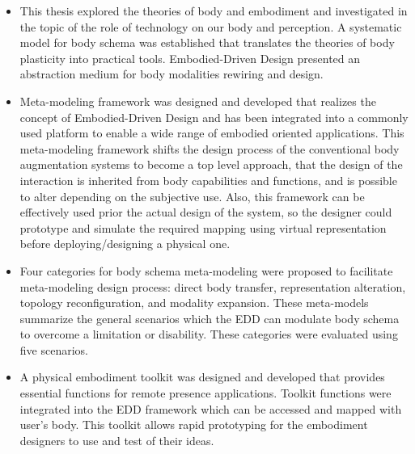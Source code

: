 \begin{itemize}
\item This thesis explored the theories of body and embodiment and investigated in the topic of the role of technology on our body and perception. A systematic model for body schema was established that translates the theories of body plasticity into practical tools. Embodied-Driven Design presented an abstraction medium for body modalities rewiring and design.

\item Meta-modeling framework was designed and developed that realizes the concept of Embodied-Driven Design and has been integrated into a commonly used platform to enable a wide range of embodied oriented applications. This meta-modeling framework shifts the design process of the conventional body augmentation systems to become a top level approach, that the design of the interaction is inherited from body capabilities and functions, and is possible to alter depending on the subjective use. Also, this framework can be effectively used prior the actual design of the system, so the designer could prototype and simulate the required mapping using virtual representation before deploying/designing a physical one.

\item Four categories for body schema meta-modeling were proposed to facilitate meta-modeling design process: direct body transfer, representation alteration, topology reconfiguration, and modality expansion. These meta-models summarize the general scenarios which the EDD can modulate body schema to overcome a limitation or disability. These categories were evaluated using five scenarios.


\item A physical embodiment toolkit was designed and developed that provides essential functions for remote presence applications. Toolkit functions were integrated into the EDD framework which can be accessed and mapped with user's body. This toolkit allows rapid prototyping for the embodiment designers to use and test of their ideas.

\end{itemize}

